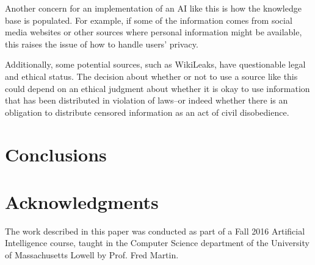 \documentclass{chi2009}
\begin{document}
Another concern for an implementation of an AI like this is how the knowledge base is populated.
For example, if some of the information comes from social media websites or other sources where personal information might be available, this raises the issue of how to handle users' privacy.

Additionally, some potential sources, such as WikiLeaks, have questionable legal and ethical status.
The decision about whether or not to use a source like this could depend on an ethical judgment about whether it is okay to use information that has been distributed in violation of laws--or indeed whether there is an obligation to distribute censored information as an act of civil disobedience.

\section{Conclusions}


\section{Acknowledgments}

The work described in this paper was conducted as part of a Fall 2016 Artificial Intelligence course, taught in the Computer Science department of the University of Massachusetts Lowell by Prof. Fred Martin.



\end{document}
